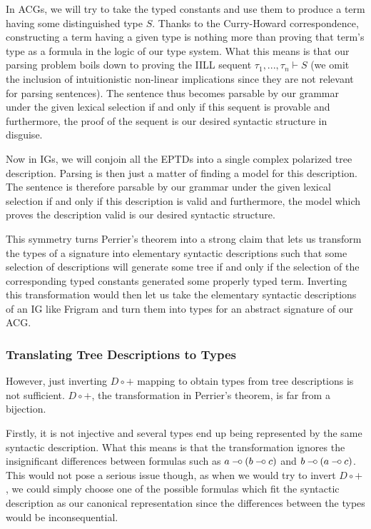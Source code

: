 In ACGs, we will try to take the typed constants and use them to produce
a term having some distinguished type $S$. Thanks to the Curry-Howard
correspondence, constructing a term having a given type is nothing more
than proving that term's type as a formula in the logic of our type
system. What this means is that our parsing problem boils down to
proving the IILL sequent $\tau_1, ..., \tau_n \vdash S$ (we omit the
inclusion of intuitionistic non-linear implications since they are not
relevant for parsing sentences). The sentence thus becomes parsable by
our grammar under the given lexical selection if and only if this
sequent is provable and furthermore, the proof of the sequent is our
desired syntactic structure in disguise.

Now in IGs, we will conjoin all the EPTDs into a single complex
polarized tree description. Parsing is then just a matter of finding a
model for this description. The sentence is therefore parsable by our
grammar under the given lexical selection if and only if this
description is valid and furthermore, the model which proves the
description valid is our desired syntactic structure.

This symmetry turns Perrier's theorem into a strong claim that lets us
transform the types of a signature into elementary syntactic
descriptions such that some selection of descriptions will generate some
tree if and only if the selection of the corresponding typed constants
generated some properly typed term. Inverting this transformation would
then let us take the elementary syntactic descriptions of an IG like
Frigram and turn them into types for an abstract signature of our ACG.

\subsubsection{Translating Tree Descriptions to Types}

However, just inverting $D \circ +$ mapping to obtain types from tree
descriptions is not sufficient. $D \circ +$, the transformation in
Perrier's theorem, is far from a bijection.

Firstly, it is not injective and several types end up being represented
by the same syntactic description. What this means is that the
transformation ignores the insignificant differences between formulas
such as $a \mathbin{{-}\mkern-3.5mu{\circ}} (b \mathbin{{-}\mkern-3.5mu{\circ}} c)$ and $b \mathbin{{-}\mkern-3.5mu{\circ}} (a \mathbin{{-}\mkern-3.5mu{\circ}} c)$. This would not
pose a serious issue though, as when we would try to invert $D \circ +$,
we could simply choose one of the possible formulas which fit the
syntactic description as our canonical representation since the
differences between the types would be inconsequential.

